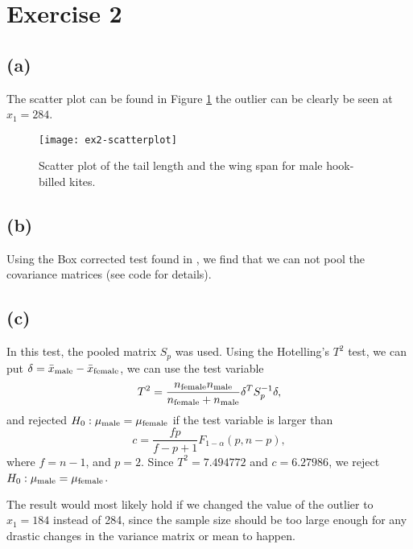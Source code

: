
\section*{Exercise 2}
\label{sec:exercise-2}

\subsection*{(a)}
\label{sec:a-1}

The scatter plot can be found in Figure \ref{fig:ex2-scatter} the outlier can be
clearly be seen at $x_1 = 284$.
\begin{figure}[h]
  \centering
  \texttt{[image: ex2-scatterplot]}
  \caption{Scatter plot of the tail length and the wing span for male
    hook-billed kites.}
  \label{fig:ex2-scatter}
\end{figure}

\subsection*{(b)}
\label{sec:b-1}

Using the Box corrected test found in \cite[p. 311]{book}, we find that
we can not pool the covariance matrices (see code for details).

\subsection*{(c)}
\label{sec:c-1}

In this test, the pooled matrix $S_p$ was used. Using the Hotelling's
$T^2$ test, we can put $\delta = \bar{x}_{\rm male}- \bar{x}_{\rm
  female}$, we can use the test variable
\begin{equation*}
  T^2 = \frac{n_{\rm female}  n_{\rm male}}{n_{\rm female} +  n_{\rm male}}\delta^T S_p^{-1}\delta,
  \label{eq:1}
\end{equation*}
and rejected $H_0: \mu_{\rm male} = \mu_{\rm female}$ if the test
variable is larger than
\begin{equation*}
 c  = \frac{fp}{f-p+1}F_{1-\alpha}(p, n-p), %
\end{equation*}
where $f = n - 1$, and $p = 2$. Since $T^2 = 7.494772$ and $c =
6.27986$, we reject $H_0: \mu_{\rm male} = \mu_{\rm female} $.

The result would most likely hold if we changed the value of the
outlier to $x_1 = 184$ instead of 284, since the sample size should be too
large enough for any drastic changes in the variance matrix or mean to
happen.

